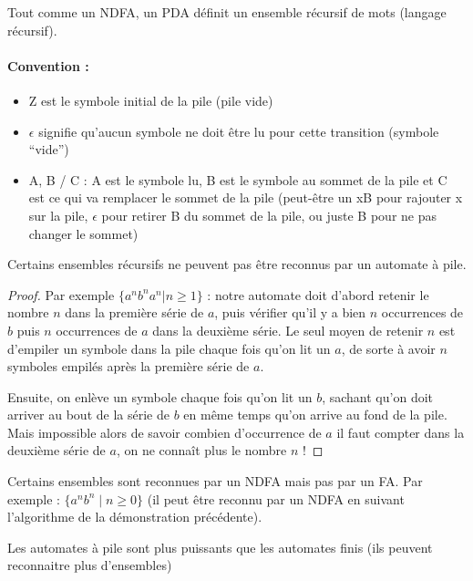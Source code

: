 \begin{myprop}
	Tout comme un NDFA, un PDA définit un ensemble récursif de mots (langage
	récursif).
\end{myprop}

\paragraph{Convention :}
\begin{itemize}
	\item Z est le symbole initial de la pile (pile vide)
	\item $\epsilon$ signifie qu’aucun symbole ne doit être lu pour cette
		transition (symbole ``vide'')
	\item A, B / C : A est le symbole lu, B est le symbole au
		sommet de la pile et C est ce qui va remplacer le
		sommet de la pile (peut-être un xB pour
		rajouter x sur la pile, $\epsilon$ pour retirer B du sommet de la pile,
		ou juste B pour ne pas changer le sommet)
\end{itemize}

\begin{myprop}
	Certains ensembles récursifs ne peuvent pas être reconnus par un automate
	à pile.
\end{myprop}

\begin{proof}
Par exemple $\{a^n b^n a^n | n\geq 1\}$ : notre automate doit d'abord retenir le nombre $n$ dans la première série de $a$, puis vérifier qu'il y a bien $n$ occurrences de $b$ puis $n$ occurrences de $a$ dans la deuxième série. Le seul moyen de retenir $n$ est d'empiler un symbole dans la pile chaque fois qu'on lit un $a$, de sorte à avoir $n$ symboles empilés après la première série de $a$.

Ensuite, on enlève un symbole chaque fois qu'on lit un $b$, sachant qu'on doit arriver au bout de la série de $b$ en même temps qu'on arrive au fond de la pile. Mais impossible alors de savoir combien d'occurrence de $a$ il faut compter dans la deuxième série de $a$, on ne connaît plus le nombre $n$ !
\end{proof}

\begin{myrem}
Certains ensembles sont reconnues par un NDFA mais pas par un FA. Par exemple : $\{a^n b^n \mid n\geq 0\}$ (il peut être reconnu par un NDFA en suivant l'algorithme de la démonstration précédente).
\end{myrem}

\begin{myprop}
	Les automates à pile sont plus puissants que les automates finis (ils
	peuvent reconnaitre plus d'ensembles)
\end{myprop}

